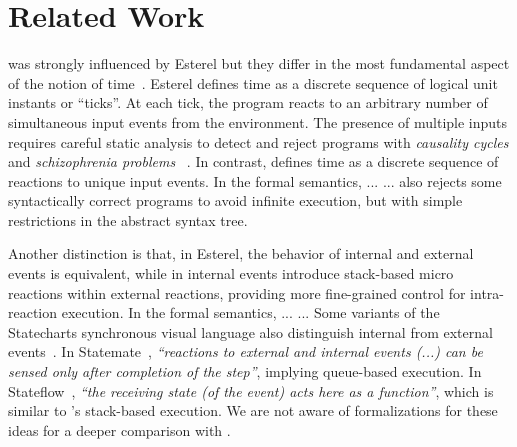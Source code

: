 \section{Related Work}

\CEU was strongly influenced by Esterel but they differ in the most fundamental
aspect of the notion of time~\cite{ceu.sensys13}.
%
Esterel defines time as a discrete sequence of logical unit instants or
``ticks''.
At each tick, the program reacts to an arbitrary number of simultaneous input
events from the environment.
%
The presence of multiple inputs requires careful static analysis to detect and
reject programs with \emph{causality cycles} and \emph{schizophrenia problems}%
~\cite{esterel.constructive,esterel.d7,esterel.d6,esterel.d3,esterel.d5,esterel.d8,esterel.d1,esterel.schizo2}.
%
In contrast, \CEU defines time as a discrete sequence of reactions to
unique input events.
%
In the formal semantics, ...  ...
\CEU also rejects some syntactically correct programs to avoid infinite
execution, but with simple restrictions in the abstract syntax tree.
%

Another distinction is that, in Esterel, the behavior of internal and external
events is equivalent, while in \CEU internal events introduce stack-based micro
reactions within external reactions, providing more fine-grained control for
intra-reaction execution.
%
In the formal semantics, ...  ...
%
Some variants of the Statecharts synchronous visual language also distinguish
internal from external events~\cite{statecharts.variants}.
In Statemate~\cite{statecharts.statemate}, \emph{``reactions to external and
internal events (...) can be sensed only after completion of the step''},
implying queue-based execution.
In Stateflow~\cite{statecharts.stateflow}, \emph{``the receiving state (of the
event) acts here as a function''}, which is similar to \CEU's
stack-based execution.
We are not aware of formalizations for these ideas for a deeper comparison with
\CEU.

